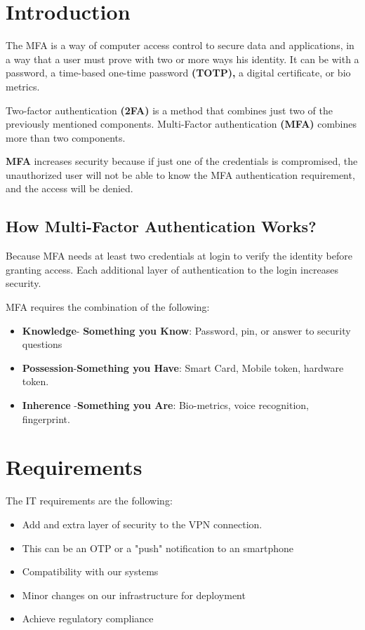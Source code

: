 \section{Introduction}

The MFA is a way of computer access control to secure data and applications,  in a way that a user must prove with two or more ways his identity. 
It can be with a password, a time-based one-time password\textbf{ (TOTP),} a digital certificate, or bio metrics.

Two-factor authentication \textbf{(2FA)} is a method that combines just two of the previously mentioned components. Multi-Factor authentication \textbf{(MFA) }combines more than two components.

\textbf{MFA} increases security because if just one of the credentials is compromised, the unauthorized user will not be able to know the MFA authentication requirement, and the access will be denied.


\subsection{How Multi-Factor Authentication Works?
}
Because MFA needs at least two credentials at login to verify the identity before granting access. Each additional layer of authentication to the login increases security.

MFA requires the combination of the following:


\begin{itemize}
\item \textbf{Knowledge}- \textbf{Something you Know}: Password, pin, or answer to security questions
\item \textbf{Possession}-\textbf{Something you Have}: Smart Card, Mobile token, hardware token.
\item \textbf{Inherence} -\textbf{Something you Are}: Bio-metrics, voice recognition, fingerprint.
\end{itemize}

\newpage
\section{Requirements}
 
The IT requirements are the following:

\begin{itemize}
\item Add and extra layer of security to the VPN connection.
\item This can be an OTP or a "push" notification to an smartphone
\item Compatibility with our systems
\item Minor changes on our infrastructure for deployment
\item Achieve regulatory compliance
\end{itemize}

